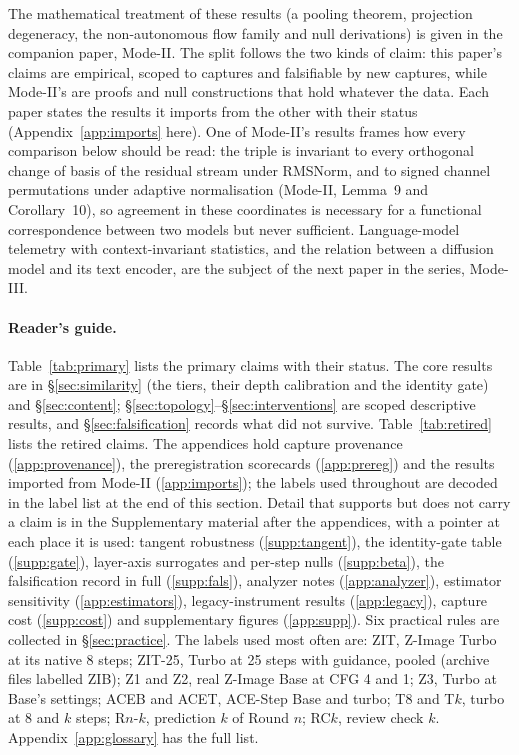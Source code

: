 \documentclass[11pt]{article}
\newcommand{\TT}{ZIT-25}%
\begin{document}
The mathematical treatment of these results (a pooling theorem, projection degeneracy, the non-autonomous flow family and null derivations) is given in the companion paper, Mode-II. The split follows the two kinds of claim: this paper's claims are empirical, scoped to captures and falsifiable by new captures, while Mode-II's are proofs and null constructions that hold whatever the data. Each paper states the results it imports from the other with their status (Appendix~\ref{app:imports} here). One of Mode-II's results frames how every comparison below should be read: the triple is invariant to every orthogonal change of basis of the residual stream under RMSNorm, and to signed channel permutations under adaptive normalisation (Mode-II, Lemma~9 and Corollary~10), so agreement in these coordinates is necessary for a functional correspondence between two models but never sufficient. Language-model telemetry with context-invariant statistics, and the relation between a diffusion model and its text encoder, are the subject of the next paper in the series, Mode-III.

\paragraph{Reader's guide.} Table~\ref{tab:primary} lists the primary claims with their status. The core results are in \S\ref{sec:similarity} (the tiers, their depth calibration and the identity gate) and \S\ref{sec:content}; \S\ref{sec:topology}--\S\ref{sec:interventions} are scoped descriptive results, and \S\ref{sec:falsification} records what did not survive. Table~\ref{tab:retired} lists the retired claims. The appendices hold capture provenance (\ref{app:provenance}), the preregistration scorecards (\ref{app:prereg}) and the results imported from Mode-II (\ref{app:imports}); the labels used throughout are decoded in the label list at the end of this section. Detail that supports but does not carry a claim is in the Supplementary material after the appendices, with a pointer at each place it is used: tangent robustness (\ref{supp:tangent}), the identity-gate table (\ref{supp:gate}), layer-axis surrogates and per-step nulls (\ref{supp:beta}), the falsification record in full (\ref{supp:fals}), analyzer notes (\ref{app:analyzer}), estimator sensitivity (\ref{app:estimators}), legacy-instrument results (\ref{app:legacy}), capture cost (\ref{supp:cost}) and supplementary figures (\ref{app:supp}). Six practical rules are collected in \S\ref{sec:practice}. The labels used most often are: ZIT, Z-Image Turbo at its native 8 steps; \TT{}, Turbo at 25 steps with guidance, pooled (archive files labelled ZIB); Z1 and Z2, real Z-Image Base at CFG 4 and 1; Z3, Turbo at Base's settings; ACEB and ACET, ACE-Step Base and turbo; T8 and T$k$, turbo at 8 and $k$ steps; R$n$-$k$, prediction $k$ of Round $n$; RC$k$, review check $k$. Appendix~\ref{app:glossary} has the full list.
\end{document}
